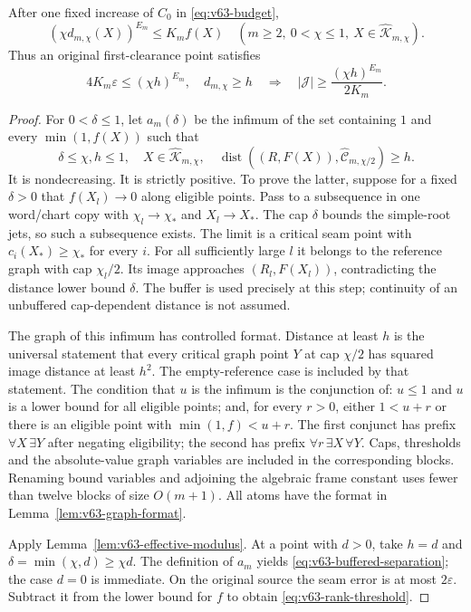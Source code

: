 \begin{theorem}
\label{thm:v63-buffered-separation}
After one fixed increase of $C_0$ in \eqref{eq:v63-budget},
\begin{equation}\label{eq:v63-buffered-separation}
 (\chi d_{m,\chi}(X))^{E_m}\le K_m f(X)
       \quad(m\ge2,\ 0<\chi\le1,\ X\in\widehat{\mathcal K}_{m,\chi}).
\end{equation}
Thus an original first-clearance point satisfies
\begin{equation}\label{eq:v63-rank-threshold}
 4K_m\varepsilon\le(\chi h)^{E_m},\quad d_{m,\chi}\ge h
 \quad\Longrightarrow\quad
 |\mathcal J|\ge\frac{(\chi h)^{E_m}}{2K_m}.
\end{equation}
\end{theorem}
\begin{proof}
For $0<\delta\le1$, let $a_m(\delta)$ be the infimum of the set
containing $1$ and every $\min(1,f(X))$ such that
\[
 \delta\le\chi,h\le1,\quad X\in\widehat{\mathcal K}_{m,\chi},
 \quad\operatorname{dist}((R,F(X)),\widehat{\mathcal C}_{m,\chi/2})\ge h.
\]
It is nondecreasing. It is strictly positive. To prove the latter,
suppose for a fixed $\delta>0$ that $f(X_l)\to0$ along eligible
points. Pass to a subsequence in one word/chart copy with
$\chi_l\to\chi_*$ and $X_l\to X_*$. The cap $\delta$ bounds the
simple-root jets, so such a subsequence exists. The limit is a critical
seam point with $c_i(X_*)\ge\chi_*$ for every $i$. For all sufficiently
large $l$ it belongs to the reference graph with cap $\chi_l/2$.
Its image approaches $(R_l,F(X_l))$, contradicting the distance lower
bound $\delta$. The buffer is used precisely at this step; continuity
of an unbuffered cap-dependent distance is not assumed.

The graph of this infimum has controlled format. Distance at least $h$
is the universal statement that every critical graph point $Y$ at cap
$\chi/2$ has squared image distance at least $h^2$. The empty-reference
case is included by that statement. The condition that $u$ is the
infimum is the conjunction of: $u\le1$ and $u$ is a lower bound for
all eligible points; and, for every $r>0$, either $1<u+r$ or there is
an eligible point with $\min(1,f)<u+r$. The first conjunct has prefix
$\forall X\,\exists Y$ after negating eligibility; the second has
prefix $\forall r\,\exists X\,\forall Y$. Caps, thresholds and the
absolute-value graph variables are included in the corresponding
blocks. Renaming bound variables and adjoining the algebraic frame
constant uses fewer than twelve blocks of size $O(m+1)$. All atoms
have the format in Lemma~\ref{lem:v63-graph-format}.

Apply Lemma~\ref{lem:v63-effective-modulus}. At a point with $d>0$,
take $h=d$ and $\delta=\min(\chi,d)\ge\chi d$. The definition of
$a_m$ yields \eqref{eq:v63-buffered-separation}; the case $d=0$ is
immediate. On the original source the seam error is at most
$2\varepsilon$. Subtract it from the lower bound for $f$ to obtain
\eqref{eq:v63-rank-threshold}.
\end{proof}

